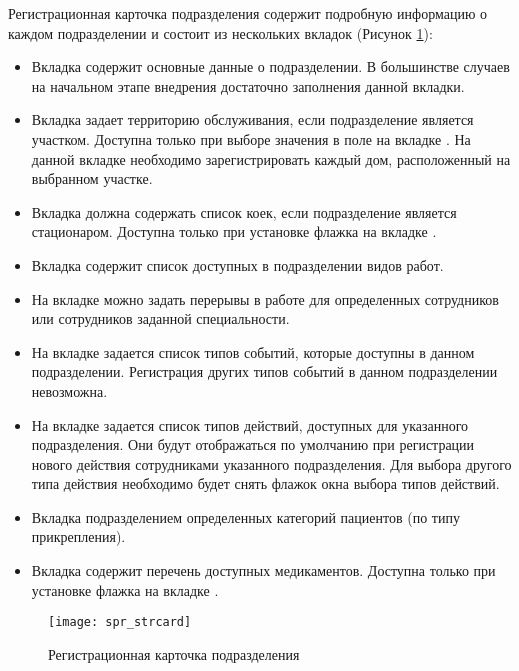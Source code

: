 Регистрационная карточка подразделения содержит подробную информацию о каждом подразделении и состоит из нескольких вкладок (Рисунок \ref{img_spr_strcard}):
\begin{itemize}
 \item Вкладка  содержит основные данные о подразделении. В большинстве случаев на начальном этапе внедрения достаточно заполнения данной вкладки.
 \item Вкладка  задает территорию обслуживания, если подразделение является участком. Доступна только при выборе значения в поле  на вкладке . На данной вкладке необходимо зарегистрировать каждый дом, расположенный на выбранном участке.
 \item Вкладка  должна содержать список коек, если подразделение является стационаром. Доступна только при установке флажка  на вкладке .
 \item Вкладка  содержит список доступных в подразделении видов работ.
 \item На вкладке  можно задать перерывы в работе для определенных сотрудников или сотрудников заданной специальности.
 \item На вкладке  задается список типов событий, которые доступны в данном подразделении. Регистрация других типов событий в данном подразделении невозможна.
 \item На вкладке  задается список типов действий, доступных для указанного подразделения. Они будут отображаться по умолчанию при регистрации нового действия сотрудниками указанного подразделения. Для выбора другого типа действия необходимо будет снять флажок  окна выбора типов действий.
 \item Вкладка  подразделением определенных категорий пациентов (по типу прикрепления).
 \item Вкладка  содержит перечень доступных медикаментов. Доступна только при установке флажка  на вкладке .
\end{itemize}
 
\begin{figure}[ht]\centering
 \texttt{[image: spr\_strcard]}
 \caption{Регистрационная карточка подразделения}
 \label{img_spr_strcard}
\end{figure} 

